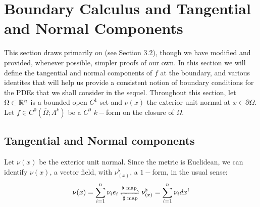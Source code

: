 \section{Boundary Calculus and Tangential and Normal Components}\label{chap:tangential-normal}
This section draws primarily on \cite{CsatoDacorognaKneuss2012} (see Section 3.2), though we have modified and provided, whenever possible, simpler proofs of our own. In this section we will define the tangential and normal components of $f$ at the boundary, and various identites that will help us provide a consistent notion of boundary conditions for the PDEs that we shall consider in the sequel. Throughout this section, let $\Omega\subset \mathbb{R}^n$ is a bounded open $C^1$ set and $\nu(x)$ the exterior unit normal at $x\in \partial \Omega$. Let $f\in C^0(\overline{\Omega};\Lambda^k)$ be a $C^0$ $k-$form on the closure of $\Omega$. 
\subsection{Tangential and Normal components}
Let $\nu(x)$ be the exterior unit normal. Since the metric is Euclidean, we can identify $\nu(x)$, a vector field, with $\nu^{\flat}_{(x)}$, a $1-$form, in the usual sense: $$\nu(x)=\sum_{i=1}^n \nu_i e_i \xrightleftharpoons[\sharp \text{ map}]{\flat \text{ map}} \nu^{\flat}_{(x)}= \sum_{i=1}^n \nu_i dx^i $$ 


